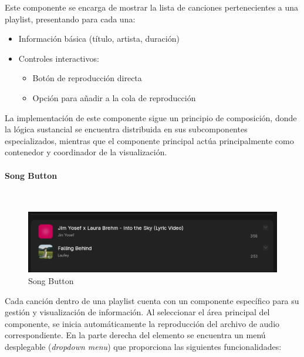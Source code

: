 \documentclass[11pt, a4paper]{article}
\begin{document}
            Este componente se encarga de mostrar la lista de canciones pertenecientes a una playlist, presentando para cada una:

            \begin{itemize}
                \item Información básica (título, artista, duración)
                \item Controles interactivos:
                \begin{itemize}
                    \item Botón de reproducción directa
                    \item Opción para añadir a la cola de reproducción
                \end{itemize}
            \end{itemize}

            La implementación de este componente sigue un principio de composición, donde la lógica sustancial se encuentra distribuida en sus subcomponentes especializados, mientras que el componente principal actúa principalmente como contenedor y coordinador de la visualización. \\

                \paragraph{Song Button}
                ‎

                \begin{figure}[H]
                    \centering
                    \includegraphics[width=1\textwidth]{media/screenshots/songbutton.png}
                    \caption{Song Button}
                    \label{fig:songbutton}
                \end{figure}

                Cada canción dentro de una playlist cuenta con un componente específico para su gestión y visualización de información. Al seleccionar el área principal del componente, se inicia automáticamente la reproducción del archivo de audio correspondiente. En la parte derecha del elemento se encuentra un menú desplegable (\textit{dropdown menu}) que proporciona las siguientes funcionalidades:
\end{document}
